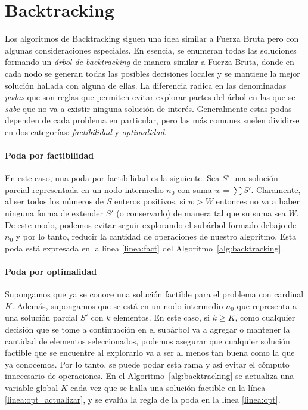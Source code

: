 \documentclass[10pt,a4paper]{article}
\begin{document}
\section{Backtracking} \label{sec:backtracking}
Los algoritmos de Backtracking siguen una idea similar a Fuerza Bruta pero con algunas consideraciones especiales. En esencia, se enumeran todas las soluciones formando un \emph{árbol de backtracking} de manera similar a Fuerza Bruta, donde en cada nodo se generan todas las posibles decisiones locales y se mantiene la mejor solución hallada con alguna de ellas. La diferencia radica en las denominadas \emph{podas} que son reglas que permiten evitar explorar partes del árbol en las que se \emph{sabe} que no va a existir ninguna solución de interés. Generalmente estas podas dependen de cada problema en particular, pero las más comunes suelen dividirse en dos categorías: \emph{factibilidad} y \emph{optimalidad}.

\paragraph{Poda por factibilidad}
En este caso, una poda por factibilidad es la siguiente. Sea $S'$ una solución parcial representada en un nodo intermedio $n_0$ con suma $w = \sum S'$. Claramente, al ser todos los números de $S$ enteros positivos, si $w > W$ entonces no va a haber ninguna forma de extender $S'$ (o conservarlo) de manera tal que su suma sea $W$. De este modo, podemos evitar seguir explorando el subárbol formado debajo de $n_0$ y por lo tanto, reducir la cantidad de operaciones de nuestro algoritmo. Esta poda está expresada en la línea \ref{linea:fact} del Algoritmo~\ref{alg:backtracking}.

\paragraph{Poda por optimalidad}
Supongamos que ya se conoce una solución factible para el problema con cardinal $K$. Además, supongamos que se está en un nodo intermedio $n_0$ que representa a una solución parcial $S'$ con $k$ elementos. En este caso, si $k \geq K$, como cualquier decisión que se tome a continuación en el subárbol va a agregar o mantener la cantidad de elementos seleccionados, podemos asegurar que cualquier solución factible que se encuentre al explorarlo va a ser al menos tan buena como la que ya conocemos. Por lo tanto, se puede podar esta rama y así evitar el cómputo innecesario de operaciones. En el Algoritmo~\ref{alg:backtracking} se actualiza una variable global $K$ cada vez que se halla una solución factible en la línea \ref{linea:opt_actualizar}, y se evalúa la regla de la poda en la línea \ref{linea:opt}.
\end{document}
